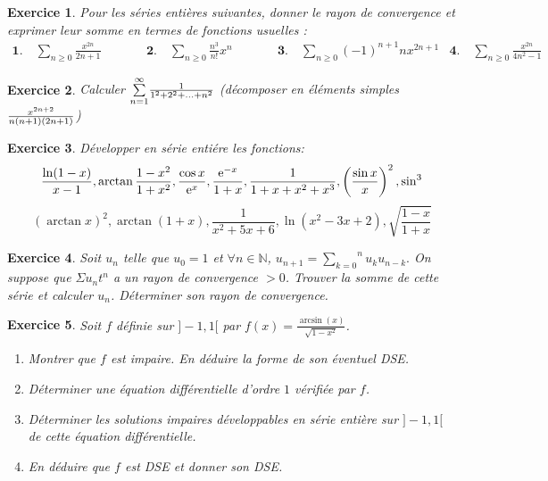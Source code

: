 \documentclass[17pt,a4paper,landscape]{article}
\newcommand{\N}{\mathbb{N}}
\newcommand{\E}{\mathrm{e}}
\theoremstyle{break}
\theoremstyle{break}
\newtheorem{Exo}{Exercice}
\begin{document}
\begin{Exo}
	Pour les séries entières suivantes, donner le rayon de convergence et exprimer leur somme en termes de fonctions
usuelles :
$$\begin{array}{llllll}
	\mathbf{1.}\quad \sum_{n\geq 0}\frac{x^{2n}}{2n+1}&\quad\quad&\mathbf{2.}\quad \sum_{n\geq 0}\frac{n^3}{n!}x^n&\quad\quad&\mathbf{3.}\quad \sum_{n\geq 0}(-1)^{n+1} nx^{2n+1}&
	\mathbf{4.}\quad \sum_{n\geq 0}\frac{x^{2n}}{4n^2-1}
\end{array}$$

\end{Exo}





\begin{Exo}
	 Calculer $\overset{\infty }{\underset{n=1}{\sum }}\frac{1}{%
	1^{2}+2^{2}+...+n^{2}}$ (décomposer en éléments simples $\frac{%
	x^{2n+2}}{n(n+1)(2n+1)}$)
\end{Exo}

 \begin{Exo}
	Développer en série entiére les fonctions: 
\begin{equation*}
	\frac{\ln (1-x)}{x-1},\arctan \frac{1-x^{2}}{1+x^{2}},\frac{\cos x}{\E^x},\frac{%
		\E^{-x}}{1+x},\frac{1}{1+x+x^{2}+x^{3}},\left( \frac{\sin x}{x}\right)
	^{2},\sin^3 
\end{equation*}%
\begin{equation*}
	\left( \arctan x\right) ^{2},\arctan (1+x),\frac{1}{x^2+5x+6},\ln(x^2-3x+2),\sqrt{\frac{1-x}{1+x}}
\end{equation*}
\end{Exo}



\begin{Exo}
	 Soit $u_n$ telle que $u_{0}=1$ et $\forall n\in \N$, $u_{n+1}=\overset{n}{\underset{k=0}{\sum }}u_{k}u_{n-k}.$ On suppose que  $\Sigma u_{n}t^{n}$ a un rayon de convergence $>0$.
Trouver la somme de cette série et calculer $u_{n}$. Déterminer son
rayon de convergence.
\end{Exo}

 \begin{Exo}
	Soit $f$ définie sur $]-1,1[$ par $f(x)=\frac{\arcsin(x)}{\sqrt{1-x^2}}$.
\begin{enumerate}
	\item
	Montrer que $f$ est impaire. En déduire la forme de son éventuel DSE.
	\item
	Déterminer une équation différentielle d'ordre $1$ vérifiée par $f$.
	\item
	Déterminer les solutions impaires développables en série entière sur $]-1,1[$  de cette équation différentielle.
	\item En déduire que $f$ est DSE et donner son DSE.
\end{enumerate}
\end{Exo}
\end{document}
